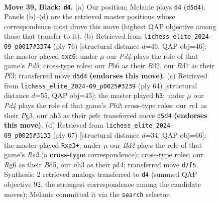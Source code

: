\documentclass[11pt]{article}
\begin{document}
\clearpage

\begin{figure}[p]\centering
\begin{subfigure}{0.46\textwidth}\centering
\resizebox{\linewidth}{!}{%
\newchessgame
\chessboard[
  setfen={3r1k2/3b1p1p/1p4r1/p2p4/P5P1/1P1K1B1N/7P/2R3R1 b - - 2 39},
  showmover=false,
  pgfstyle=straightmove, color=movearrow, markmove={d5-d4}
]}
\caption{}
\end{subfigure}\hfill
\begin{subfigure}{0.46\textwidth}\centering
\resizebox{\linewidth}{!}{%
\newchessgame
\chessboard[
  setfen={rr6/4kp2/2p3p1/3Pp1P1/p1P5/5PK1/R2B4/R7 w - - 0 39},
  showmover=false,
  pgfstyle=straightmove, color=movearrow, markmove={d5-c6}
]}
\caption{}
\end{subfigure}
\\[4pt]
\begin{subfigure}{0.46\textwidth}\centering
\resizebox{\linewidth}{!}{%
\newchessgame
\chessboard[
  setfen={8/r2n1ppp/1pk1p3/8/r1P5/PR1KB1P1/5P1P/R7 w - - 3 33},
  showmover=false,
  pgfstyle=straightmove, color=movearrow, markmove={h2-h3}
]}
\caption{}
\end{subfigure}\hfill
\begin{subfigure}{0.46\textwidth}\centering
\resizebox{\linewidth}{!}{%
\newchessgame
\chessboard[
  setfen={4r3/4r1k1/p5p1/1p1b3p/3P4/1P1BP1KP/P7/4RR2 b - - 0 34},
  showmover=false,
  pgfstyle=straightmove, color=movearrow, markmove={e7-e3}
]}
\caption{}
\end{subfigure}
\caption{\textbf{Move 39, Black: \texttt{d4}.} (a) Our position; Melanie plays \texttt{d4} (\texttt{d5d4}). Panels (b)--(d) are the retrieved master positions whose correspondence most drove this move (highest QAP objective among those that transfer to it). (b) Retrieved from \texttt{lichess\_elite\_2024-09\_p0017\#3374} (ply 76) [structural distance $d$=46, QAP obj=46]: the master played \texttt{dxc6}; under $\mu$ our \emph{Pd4} plays the role of that game's \emph{Pd5}; cross-type roles: our \emph{P}b6 as their \emph{B}d2, our \emph{B}d7 as their \emph{P}f3; transferred move \texttt{d5d4} \textbf{(endorses this move)}. (c) Retrieved from \texttt{lichess\_elite\_2024-09\_p0025\#3239} (ply 64) [structural distance $d$=55, QAP obj=45]: the master played \texttt{h3}; under $\mu$ our \emph{Pd4} plays the role of that game's \emph{Ph2}; cross-type roles: our \emph{r}c1 as their \emph{P}g3, our \emph{n}h3 as their \emph{p}e6; transferred move \texttt{d5d4} \textbf{(endorses this move)}. (d) Retrieved from \texttt{lichess\_elite\_2024-09\_p0025\#3133} (ply 67) [structural distance $d$=34, QAP obj=66]: the master played \texttt{Rxe3+}; under $\mu$ our \emph{Bd2} plays the role of that game's \emph{Re2} (a \textbf{cross-type} correspondence); cross-type roles: our \emph{R}g6 as their \emph{B}d5, our \emph{n}h3 as their \emph{p}d4; transferred move \texttt{d7f5}. Synthesis: 2 retrieved analogs transferred to \texttt{d4} (summed QAP objective 92, the strongest correspondence among the candidate moves); Melanie committed it via the \texttt{search} selector.}
\label{fig:thought-m77}
\end{figure}
\end{document}
